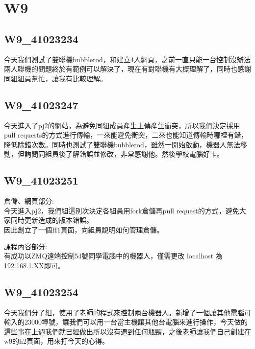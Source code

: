 \chapter{W9}
\section{W9_41023234}
今天我們測試了雙聯機bubblerod，和建立4人網頁，之前一直只能一台控制沒辦法兩人聯機的問題終於有範例可以解決了，現在有對聯機有大概理解了，同時也感謝同組組員幫忙，讓我有比較理解。\\
\section{W9_41023247}
今天進入了pj2的網站，為避免同組成員產生上傳產生衝突，所以我們決定採用pull requests的方式進行傳輸，一來能避免衝突，二來也能知道傳輸時哪裡有錯，降低除錯次數。同時也測試了雙聯機bubblerod，雖然一開始啟動，機器人無法移動，但詢問同組員後了解錯誤並修改，非常感謝他。然後學校電腦好卡。\\
\section{W9_41023251}
倉儲、網頁部分:\\

今天進入pj2，我們組這別次決定各組員用fork倉儲再pull request的方式，避免大家同時更新造成的版本錯誤。\\
因此創立了一個H1頁面，向組員說明如何管理倉儲。\par
課程內容部分:\\
有成功以ZMQ遠端控制54號同學電腦中的機器人，僅需更改 localhost 為192.168.1.XX即可。\\
\section{W9_41023254}
今天我們分了組，使用了老師的程式來控制兩台機器人，新增了一個讓其他電腦可輸入的23000埠號，讓我們可以用一台當主機讓其他台電腦來進行操作，今天做的這些事在上週我們就已經做出所以沒有遇到任何瓶頸，之後老師讓我們自己創建在w9的h2頁面，用來打今天的心得。\\